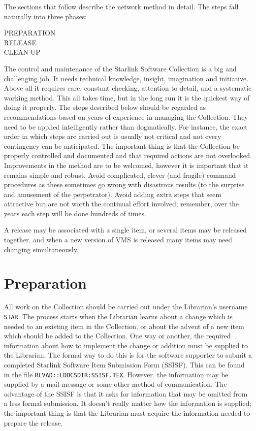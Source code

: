 The sections that follow describe the network method in detail.
The steps fall naturally into three phases:
\begin{description}
\item [PREPARATION]
\item [RELEASE]
\item [CLEAN-UP]
\end{description}
The control and maintenance of the Starlink Software Collection is a big and
challenging job.
It needs technical knowledge, insight, imagination and initiative.
Above all it requires care, constant checking, attention to detail, and a
systematic working method.
This all takes time, but in the long run it is the quickest way of doing it
properly.
The steps described below should be regarded as recommendations based on years
of experience in managing the Collection.
They need to be applied intelligently rather than dogmatically.
For instance, the exact order in which steps are carried out is usually not
critical and not every contingency can be anticipated.
The important thing is that the Collection be properly controlled and
documented and that required actions are not overlooked.
Improvements in the method are to be welcomed, however it is important that it
remains simple and robust.
Avoid complicated, clever (and fragile) command procedures as these sometimes
go wrong with disastrous results (to the surprise and amusement of the
perpetrator).
Avoid adding extra steps that seem attractive but are not worth the continual
effort involved; remember, over the years each step will be done hundreds of
times.

A release may be associated with a single item, or several  items may be
released together, and when a new version of VMS is released many items may
need changing simultaneously.

\section {Preparation}

All work on the Collection should be carried out under the Librarian's username
{\tt STAR}.
The process starts when the Librarian learns about a change which is needed to
an existing item in the Collection, or about the advent of a new item which
should be added to the Collection.
One way or another, the required information about how to implement the change
or addition must be supplied to the Librarian.
The formal way to do this is for the software supporter to submit a completed
Starlink Software Item Submission Form (SSISF).
This can be found in the file {\tt RLVAD::LDOCSDIR:SSISF.TEX}.
However, the information may be supplied by a mail message or some other
method of communication.
The advantage of the SSISF is that it asks for information that may be omitted
from a less formal submission.
It doesn't really matter how the information is supplied; the important thing
is that the Librarian must acquire the information needed to prepare the
release.

